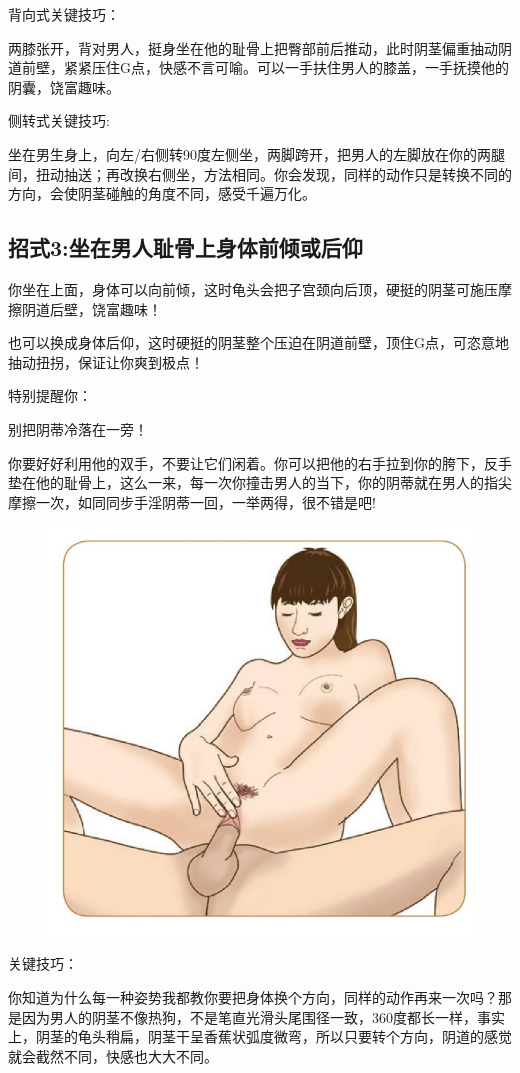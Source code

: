 \documentclass[12pt,UTF8]{ctexbook}
\begin{document}
背向式关键技巧：

两膝张开，背对男人，挺身坐在他的耻骨上把臀部前后推动，此时阴茎偏重抽动阴道前壁，紧紧压住G点，快感不言可喻。可以一手扶住男人的膝盖，一手抚摸他的阴囊，饶富趣味。

侧转式关键技巧:

坐在男生身上，向左/右侧转90度左侧坐，两脚跨开，把男人的左脚放在你的两腿间，扭动抽送；再改换右侧坐，方法相同。你会发现，同样的动作只是转换不同的方向，会使阴茎碰触的角度不同，感受千遍万化。

\subsection{招式3:坐在男人耻骨上身体前倾或后仰}

你坐在上面，身体可以向前倾，这时龟头会把子宫颈向后顶，硬挺的阴茎可施压摩擦阴道后壁，饶富趣味！

也可以换成身体后仰，这时硬挺的阴茎整个压迫在阴道前壁，顶住G点，可恣意地抽动扭拐，保证让你爽到极点！

特别提醒你：

别把阴蒂冷落在一旁！

你要好好利用他的双手，不要让它们闲着。你可以把他的右手拉到你的胯下，反手垫在他的耻骨上，这么一来，每一次你撞击男人的当下，你的阴蒂就在男人的指尖摩擦一次，如同同步手淫阴蒂一回，一举两得，很不错是吧!

\begin{figure}[htbp]
	\centering
	\includegraphics[width=0.7\linewidth]{26}
	\caption{}
	\label{fig:1}
\end{figure}

关键技巧：

你知道为什么每一种姿势我都教你要把身体换个方向，同样的动作再来一次吗？那是因为男人的阴茎不像热狗，不是笔直光滑头尾围径一致，360度都长一样，事实上，阴茎的龟头稍扁，阴茎干呈香蕉状弧度微弯，所以只要转个方向，阴道的感觉就会截然不同，快感也大大不同。
\end{document}
